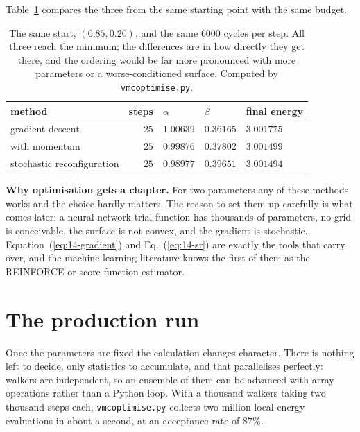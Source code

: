 Table~\ref{tab:14-optimisers} compares the three from the same starting point
with the same budget.

\begin{table}[h]
\centering
\renewcommand{\arraystretch}{1.25}
\setlength{\tabcolsep}{12pt}
\begin{tabular}{lrlll}
\toprule
method & steps & $\alpha$ & $\beta$ & final energy\\
\midrule
gradient descent           & $25$ & $1.00639$ & $0.36165$ & $3.001775$\\
with momentum              & $25$ & $0.99876$ & $0.37802$ & $3.001499$\\
stochastic reconfiguration & $25$ & $0.98977$ & $0.39651$ & $3.001494$\\
\bottomrule
\end{tabular}
\caption{The same start, $(0.85,0.20)$, and the same $6000$ cycles per step.
All three reach the minimum; the differences are in how directly they get
there, and the ordering would be far more pronounced with more parameters or
a worse-conditioned surface.  Computed by \texttt{vmcoptimise.py}.}
\label{tab:14-optimisers}
\end{table}

\begin{notebox}
\textbf{Why optimisation gets a chapter.} For two parameters any of these
methods works and the choice hardly matters.  The reason to set them up
carefully is what comes later: a neural-network trial function has thousands
of parameters, no grid is conceivable, the surface is not convex, and the
gradient is stochastic.  Equation~(\ref{eq:14-gradient}) and
Eq.~(\ref{eq:14-sr}) are exactly the tools that carry over, and the
machine-learning literature knows the first of them as the REINFORCE or
score-function estimator.
\end{notebox}

\section{The production run}
\label{sec:optproduction}

Once the parameters are fixed the calculation changes character.  There is
nothing left to decide, only statistics to accumulate, and that parallelises
perfectly: walkers are independent, so an ensemble of them can be advanced
with array operations rather than a Python loop.  With a thousand walkers
taking two thousand steps each, \texttt{vmcoptimise.py} collects two million
local-energy evaluations in about a second, at an acceptance rate of $87\%$.

